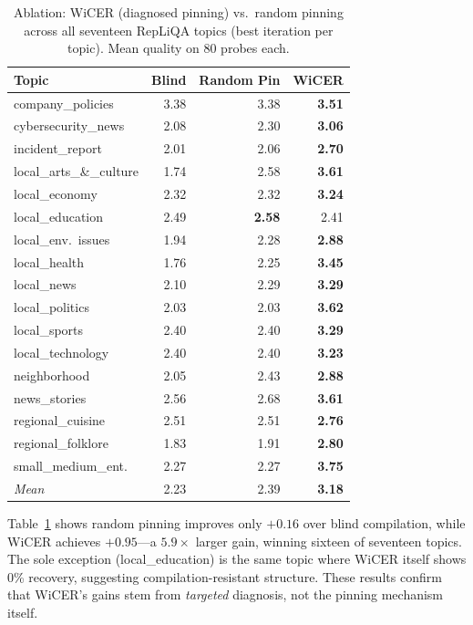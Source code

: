\documentclass{article}
\begin{document}
\begin{table}[t]
\centering
\caption{Ablation: WiCER (diagnosed pinning) vs.\ random pinning across
all seventeen RepLiQA topics (best iteration per topic). Mean quality on 80 probes each.}
\label{tab:ablation}
\footnotesize
\begin{tabular}{lrrr}
\toprule
\textbf{Topic} & \textbf{Blind} & \textbf{Random Pin} & \textbf{WiCER} \\
\midrule
company\_policies       & 3.38 & 3.38          & \textbf{3.51} \\
cybersecurity\_news     & 2.08 & 2.30          & \textbf{3.06} \\
incident\_report        & 2.01 & 2.06          & \textbf{2.70} \\
local\_arts\_\&\_culture & 1.74 & 2.58          & \textbf{3.61} \\
local\_economy          & 2.32 & 2.32          & \textbf{3.24} \\
local\_education        & 2.49 & \textbf{2.58} & 2.41          \\
local\_env.\ issues     & 1.94 & 2.28          & \textbf{2.88} \\
local\_health           & 1.76 & 2.25          & \textbf{3.45} \\
local\_news             & 2.10 & 2.29          & \textbf{3.29} \\
local\_politics         & 2.03 & 2.03          & \textbf{3.62} \\
local\_sports           & 2.40 & 2.40          & \textbf{3.29} \\
local\_technology       & 2.40 & 2.40          & \textbf{3.23} \\
neighborhood            & 2.05 & 2.43          & \textbf{2.88} \\
news\_stories           & 2.56 & 2.68          & \textbf{3.61} \\
regional\_cuisine       & 2.51 & 2.51          & \textbf{2.76} \\
regional\_folklore      & 1.83 & 1.91          & \textbf{2.80} \\
small\_medium\_ent.     & 2.27 & 2.27          & \textbf{3.75} \\
\midrule
\textit{Mean}           & 2.23 & 2.39          & \textbf{3.18} \\
\bottomrule
\end{tabular}
\end{table}

Table~\ref{tab:ablation} shows random pinning improves only $+0.16$
over blind compilation, while WiCER achieves $+0.95$---a $5.9\times$
larger gain, winning sixteen of seventeen topics. The sole exception
(local\_education) is the same topic where WiCER itself shows 0\%
recovery, suggesting compilation-resistant structure. These results
confirm that WiCER's gains stem from \emph{targeted} diagnosis, not the
pinning mechanism itself.
\end{document}
